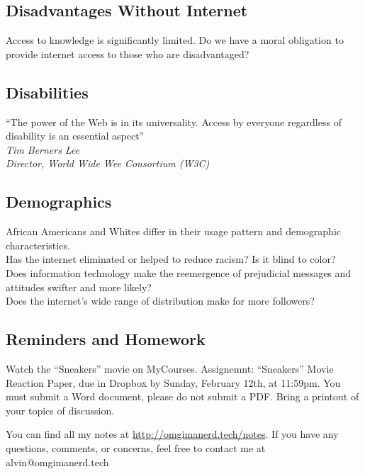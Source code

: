 \documentclass[letterpaper, 12pt]{article}
\begin{document}
\subsection*{Disadvantages Without Internet}
Access to knowledge is significantly limited.
Do we have a moral obligation to provide internet access to those who are
disadvantaged?

\subsection*{Disabilities}
``The power of the Web is in its universality. Access by everyone regardless of
disability is an essential aspect'' \\
\textit{Tim Berners Lee} \\
\textit{Director, World Wide Wee Consortium (W3C)}

\subsection*{Demographics}
African Americans and Whites differ in their usage pattern and demographic
characteristics. \\
Has the internet eliminated or helped to reduce racism? Is it blind to color? \\
Does information technology make the reemergence of prejudicial messages and
attitudes swifter and more likely? \\
Does the internet's wide range of distribution make for more followers?

\subsection*{Reminders and Homework}
Watch the ``Sneakers'' movie on MyCourses.
Assignemnt: ``Sneakers'' Movie Reaction Paper, due in Dropbox by Sunday,
February 12th, at 11:59pm. You must submit a Word document, please do not
submit a PDF.
Bring a printout of your topics of discussion.

\begin{center}
  You can find all my notes at \url{http://omgimanerd.tech/notes}. If you have
  any questions, comments, or concerns, feel free to contact me at
  alvin@omgimanerd.tech
\end{center}
\end{document}
